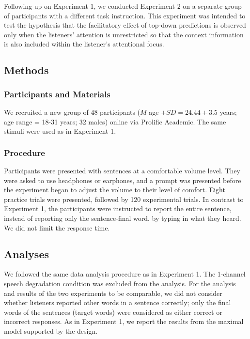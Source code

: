 \documentclass[a4paper, nobind]{templates/ociamthesis}
\begin{document}
Following up on Experiment 1, we conducted Experiment 2 on a separate group of participants with a different task instruction.
This experiment was intended to test the hypothesis that the facilitatory effect of top-down predictions is observed only when the listeners' attention is unrestricted so that the context information is also included within the listener's attentional focus.

\hypertarget{methods-1}{%
\subsection{Methods}\label{methods-1}}

\hypertarget{participants-and-materials}{%
\subsubsection{Participants and Materials}\label{participants-and-materials}}

We recruited a new group of 48 participants (\(M\) age \(\pm SD = 24.44 \pm 3.5\) years; age range = 18-31 years; 32 males) online via Prolific Academic.
The same stimuli were used as in Experiment 1.

\hypertarget{procedure-1}{%
\subsubsection{Procedure}\label{procedure-1}}

Participants were presented with sentences at a comfortable volume level.
They were asked to use headphones or earphones, and a prompt was presented before the experiment began to adjust the volume to their level of comfort.
Eight practice trials were presented, followed by 120 experimental trials.
In contrast to Experiment 1, the participants were instructed to report the entire sentence, instead of reporting only the sentence-final word, by typing in what they heard.
We did not limit the response time.

\hypertarget{analyses-1}{%
\subsection{Analyses}\label{analyses-1}}

We followed the same data analysis procedure as in Experiment 1.
The 1-channel speech degradation condition was excluded from the analysis.
For the analysis and results of the two experiments to be comparable,
we did not consider whether listeners reported other words in a sentence correctly;
only the final words of the sentences (target words) were considered as either correct or incorrect responses.
As in Experiment 1, we report the results from the maximal model supported by the design.
\end{document}
